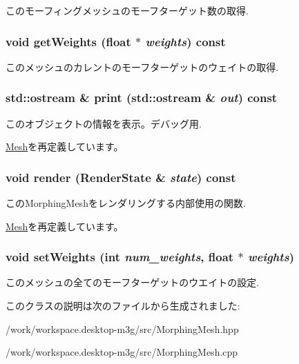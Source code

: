 このモーフィングメッシュのモーフターゲット数の取得. \hypertarget{classm3g_1_1MorphingMesh_80cef3b2c5e4881567409829de224e46}{
\subsubsection[{getWeights}]{\setlength{\rightskip}{0pt plus 5cm}void getWeights (float $\ast$ {\em weights}) const}}
\label{classm3g_1_1MorphingMesh_80cef3b2c5e4881567409829de224e46}


このメッシュのカレントのモーフターゲットのウェイトの取得. \hypertarget{classm3g_1_1MorphingMesh_6fea17fa1532df3794f8cb39cb4f911f}{
\subsubsection[{print}]{\setlength{\rightskip}{0pt plus 5cm}std::ostream \& print (std::ostream \& {\em out}) const}}
\label{classm3g_1_1MorphingMesh_6fea17fa1532df3794f8cb39cb4f911f}


このオブジェクトの情報を表示。デバッグ用. 

\hyperlink{classm3g_1_1Mesh_6fea17fa1532df3794f8cb39cb4f911f}{Mesh}を再定義しています。\hypertarget{classm3g_1_1MorphingMesh_8babc8a79b78615da51161e94029eea9}{
\subsubsection[{render}]{\setlength{\rightskip}{0pt plus 5cm}void render ({\bf RenderState} \& {\em state}) const}}
\label{classm3g_1_1MorphingMesh_8babc8a79b78615da51161e94029eea9}


このMorphingMeshをレンダリングする内部使用の関数. 

\hyperlink{classm3g_1_1Mesh_8babc8a79b78615da51161e94029eea9}{Mesh}を再定義しています。\hypertarget{classm3g_1_1MorphingMesh_b97015e8aeed76a33582eb11d06e322b}{
\subsubsection[{setWeights}]{\setlength{\rightskip}{0pt plus 5cm}void setWeights (int {\em num\_\-weights}, \/  float $\ast$ {\em weights})}}
\label{classm3g_1_1MorphingMesh_b97015e8aeed76a33582eb11d06e322b}


このメッシュの全てのモーフターゲットのウエイトの設定. 

このクラスの説明は次のファイルから生成されました:\begin{CompactItemize}
\item 
/work/workspace.desktop-m3g/src/MorphingMesh.hpp\item 
/work/workspace.desktop-m3g/src/MorphingMesh.cpp\end{CompactItemize}

